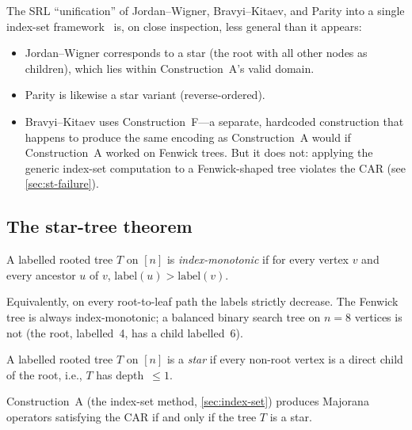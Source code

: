 The SRL ``unification'' of Jordan--Wigner,
Bravyi--Kitaev, and Parity into a single index-set
framework~\cite{seeley2012} is, on close inspection, less general
than it appears:
\begin{itemize}
  \item Jordan--Wigner corresponds to a star (the root with all other
    nodes as children), which lies within Construction~A's valid domain.
  \item Parity is likewise a star variant (reverse-ordered).
  \item Bravyi--Kitaev uses Construction~F---a separate, hardcoded
    construction that happens to produce the same encoding as
    Construction~A would if Construction~A worked on Fenwick trees.
    But it does not: applying the generic index-set computation
    to a Fenwick-shaped tree violates the CAR (see
    \cref{sec:st-failure}).
\end{itemize}

\subsection{The star-tree theorem}
\label{sec:st-theorem}

\begin{definition}
\label{def:monotonic}
A labelled rooted tree $T$ on $[n]$ is \emph{index-monotonic} if for
every vertex $v$ and every ancestor $u$ of $v$,
$\mathrm{label}(u) > \mathrm{label}(v)$.
\end{definition}

Equivalently, on every root-to-leaf path the labels strictly decrease.
The Fenwick tree is always index-monotonic; a balanced binary search
tree on $n = 8$ vertices is not (the root, labelled~4, has a child
labelled~6).

\begin{definition}
\label{def:star}
A labelled rooted tree $T$ on $[n]$ is a \emph{star} if every
non-root vertex is a direct child of the root, i.e., $T$ has
depth~$\le 1$.
\end{definition}

\begin{theorem}
\label{thm:star-tree}
Construction~A (the index-set method, \cref{sec:index-set}) produces
Majorana operators satisfying the CAR if and only if the tree $T$ is a
star.
\end{theorem}

